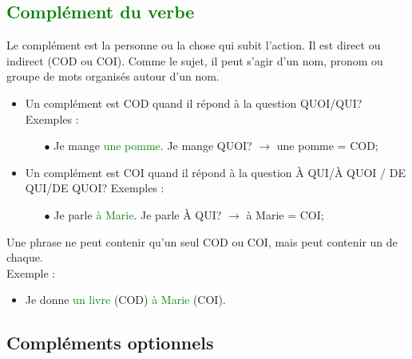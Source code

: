 \documentclass[12pt, openany]{report}
\begin{document}
\subsection{\textcolor{green}{Complément du verbe}}
Le complément est la personne ou la chose qui subit l'action. Il est direct ou indirect (COD ou COI). Comme le sujet, il peut s'agir  d'un nom, pronom ou groupe de mots organisés autour d'un nom.\\ 
\begin{itemize}
    \item Un complément est COD quand il répond à la question QUOI/QUI? Exemples : 
    \begin{itemize}
        \item [$\bullet$] Je mange \textcolor{green}{une pomme}. Je mange QUOI? $\rightarrow$ une pomme = COD;
    \end{itemize}
    \item Un complément est COI quand il répond à la question À QUI/À QUOI / DE QUI/DE QUOI? Exemples :
    \begin{itemize}
        \item [$\bullet$] Je parle \textcolor{green}{à Marie}. Je parle À QUI? $\rightarrow$ à Marie = COI;
    \end{itemize}
\end{itemize}
Une phrase ne peut contenir qu'un seul COD ou COI, mais peut contenir un de chaque. \\ Exemple :
\begin{itemize}
    \item Je donne \textcolor{green}{un livre} (COD) \textcolor{green}{à Marie} (COI).
\end{itemize}
\subsection{Compléments optionnels}
\end{document}
